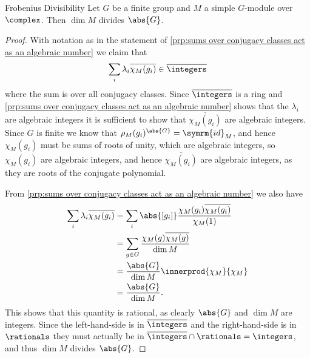 \documentclass[fleqn]{NotesClass}
\newcommand{\id}{\symrm{id}}
\newcommand{\algIntegers}{\overline{\integers}}
\begin{document}
    \begin{thm}{Frobenius Divisibility}{}
        Let \(G\) be a finite group and \(M\) a simple \(G\)-module over \(\complex\).
        Then \(\dim M\) divides \(\abs{G}\).
        \begin{proof}
            With notation as in the statement of \cref{prp:sums over conjugacy classes act as an algebraic number} we claim that
            \begin{equation}
                \sum_i \lambda_i \overline{\chi_M(g_i)} \in \algIntegers
            \end{equation}
            where the sum is over all conjugacy classes.
            Since \(\algIntegers\) is a ring and \cref{prp:sums over conjugacy classes act as an algebraic number} shows that the \(\lambda_i\) are algebraic integers it is sufficient to show that \(\overline{\chi_M(g_i)}\) are algebraic integers.
            Since \(G\) is finite we know that \(\rho_M(g_i)^{\abs{G}} = \id_M\), and hence \(\chi_M(g_i)\) must be sums of roots of unity, which are algebraic integers, so \(\chi_M(g_i)\) are algebraic integers, and hence \(\overline{\chi_M(g_i)}\) are algebraic integers, as they are roots of the conjugate polynomial.
            
            From \cref{prp:sums over conjugacy classes act as an algebraic number} we also have
            \begin{align}
                \sum_i \lambda_i \overline{\chi_M(g_i)} &= \sum_i \abs{[g_i]} \frac{\chi_M(g_i) \overline{\chi_M(g_i)}}{\chi_M(1)}\\
                &= \sum_{g \in G} \frac{\chi_M(g) \overline{\chi_M(g)}}{\dim M}\\
                &= \frac{\abs{G}}{\dim M} \innerprod{\chi_M}{\chi_M}\\
                &= \frac{\abs{G}}{\dim M}.
            \end{align}
            This shows that this quantity is rational, as clearly \(\abs{G}\) and \(\dim M\) are integers.
            Since the left-hand-side is in \(\algIntegers\) and the right-hand-side is in \(\rationals\) they must actually be in \(\algIntegers \cap \rationals = \integers\), and thus \(\dim M\) divides \(\abs{G}\).
        \end{proof}
    \end{thm}
    
\end{document}
